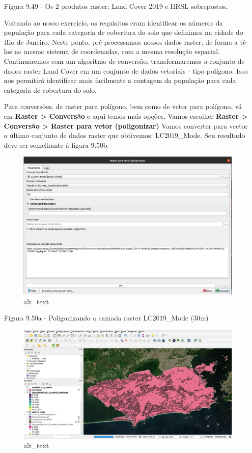 \documentclass[
  portuguese,
]{krantz}
\begin{document}
Figura 9.49 - Os 2 produtos raster: Land Cover 2019 e HRSL sobrepostos.

Voltando ao nosso exercício, os requisitos eram identificar os números da população para cada categoria de cobertura do solo que definimos na cidade do Rio de Janeiro. Neste ponto, pré-processamos nossos dados raster, de forma a tê-los no mesmo sistema de coordenadas, com a mesma resolução espacial. Continuaremos com um algoritmo de conversão, transformaremos o conjunto de dados raster Land Cover em um conjunto de dados vetoriais - tipo polígono. Isso nos permitirá identificar mais facilmente a contagem da população para cada categoria de cobertura do solo.

Para conversões, de raster para polígono, bem como de vetor para polígono, vá em \textbf{Raster \textgreater{} Conversão} e aqui temos mais opções. Vamos escolher \textbf{Raster \textgreater{} Conversão \textgreater{} Raster para vetor (poligonizar)} Vamos converter para vector o último conjunto de dados raster que obtivemos: LC2019\_Mode. Seu resultado deve ser semelhante à figura 9.50b.

\begin{figure}
\centering
\includegraphics{media/modulo9/fig950_a.png}
\caption{alt\_text}
\end{figure}

Figura 9.50a - Poligonizando a camada raster LC2019\_Mode (30m)

\begin{figure}
\centering
\includegraphics{media/modulo9/fig950_b.png}
\caption{alt\_text}
\end{figure}
\end{document}
